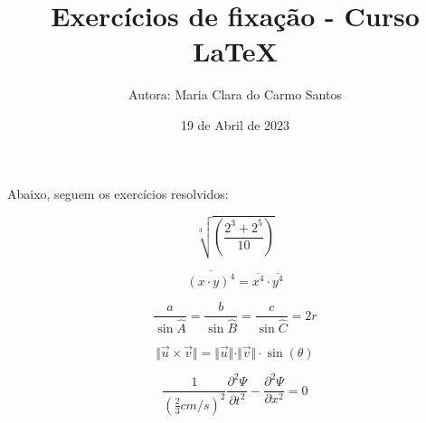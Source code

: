 \documentclass[a4paper, 12pt]{article}
\title{Exercícios de fixação - Curso LaTeX}
\author{Autora: Maria Clara do Carmo Santos}
\date{19 de Abril de 2023}
\begin{document}
\maketitle

Abaixo, seguem os exercícios resolvidos:

\begin{equation}
\sqrt[3]{\left(\frac{2^3+2^5}{10}\right)}
\end{equation}

\begin{equation}
\overline{(x\cdot y)^4} = \overline{x^4}\cdot \overline{y^4}
\end{equation}

\begin{equation}
\frac{a}{\sin \widehat{A}} = \frac{b}{\sin \widehat{B}} = \frac{c}{\sin \widehat{C}} = 2r
\end{equation}

\begin{equation}
\Vert\vec{u}\times \vec{v} \Vert = \Vert \vec{u} \Vert \cdot \Vert \vec{v} \Vert \cdot \sin(\theta)
\end{equation}

\begin{equation}
\frac{1}{\left(\frac{2}{3}cm/s\right)^2} \frac{\partial^2\Psi}{\partial t^2}-\frac{\partial^2\Psi}{\partial x^2} = 0
\end{equation}
\end{document}
